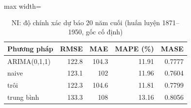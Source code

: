 \begin{table}[H]
\centering\small
\caption{NI: độ chính xác dự báo 20 năm cuối (huấn luyện 1871--1950, gốc cố định)}\label{tab:tab_b12_11_ni_benchmarks}
\begin{adjustbox}{max width=\linewidth}
\begin{tabular}{lrrrr}
\toprule
Phương pháp & RMSE & MAE & MAPE (\%) & MASE \\
\midrule
ARIMA(0,1,1) & 122.8 & 104.3 & 11.91 & 0.7777 \\
naive & 123.1 & 102 & 11.96 & 0.7604 \\
trôi & 122.3 & 104.6 & 11.81 & 0.7799 \\
trung bình & 133.3 & 108 & 13.16 & 0.8056 \\
\bottomrule
\end{tabular}
\end{adjustbox}
\end{table}
